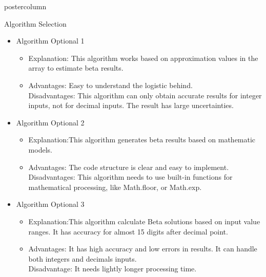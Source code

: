\documentclass[final,hyperref={pdfpagelabels=false}]{beamer}
\begin{document}
\begin{frame}
\begin{columns}
\begin{column}{.49\textwidth}
\begin{beamercolorbox}[center,wd=\textwidth]{postercolumn}
\begin{minipage}[T]{.95\textwidth}
{           
           
           
         
         
            \begin{block}{Algorithm Selection}
            \begin{itemize}
           
              
             
              \item Algorithm Optional 1
                \begin{itemize}
                \item Explanation: This algorithm works based on approximation values in the array to estimate beta results.
                \item Advantages: Easy to understand the logistic behind. \\
Disadvantages: This algorithm can only obtain accurate results for integer inputs, not for decimal inputs. The result has large uncertainties.


                \end{itemize}
                 \item Algorithm Optional 2
                \begin{itemize}
                \item Explanation:This algorithm generates beta results based on mathematic models.
                \item Advantages: The code structure is clear and easy to implement. \\
Disadvantages: This algorithm needs to use built-in functions for mathematical processing, like Math.floor, or Math.exp.




                \end{itemize}
                
                
                
                
                
                   \item Algorithm Optional 3
                \begin{itemize}
                \item Explanation:This algorithm calculate Beta solutions based on input value ranges. It has accuracy for almost 15 digits after decimal point. 
                \item Advantages:  It has high accuracy and low errors in results. It can handle both integers and decimals inputs. \\
Disadvantage: It needs lightly longer processing time.





\end{itemize}
\end{itemize}
\end{block}}
\end{minipage}
\end{beamercolorbox}
\end{column}
\end{columns}
\end{frame}
\end{document}
